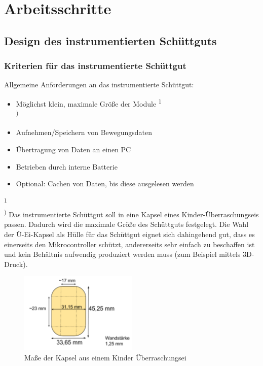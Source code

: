 \section{Arbeitsschritte}
 
\subsection{Design des instrumentierten Schüttguts}
\subsubsection{Kriterien für das instrumentierte Schüttgut}

Allgemeine Anforderungen an das instrumentierte Schüttgut:

\begin{itemize}
	\item Möglichst klein, maximale Größe der Module \textsuperscript{1\\)}
	\item Aufnehmen/Speichern von Bewegungsdaten
	\item Übertragung von Daten an einen PC
	\item Betrieben durch interne Batterie
	\item Optional: Cachen von Daten, bis diese ausgelesen werden 
\end{itemize}

\textsuperscript{1\\)} Das instrumentierte Schüttgut soll in eine Kapsel eines Kinder-Überraschungseis passen. Dadurch wird die maximale Größe des Schüttguts festgelegt. Die Wahl der Ü-Ei-Kapsel als Hülle für das Schüttgut eignet sich dahingehend gut, dass es einerseits den Mikrocontroller schützt, andererseits sehr einfach zu beschaffen ist und kein Behältnis aufwendig produziert werden muss (zum Beispiel mittels 3D-Druck).

\begin{figure}[ht]
	\centering
	\includegraphics[width=0.5\textwidth]{images/k3-ueei.PNG}
	\caption {Maße der Kapsel aus einem Kinder Überraschungsei}
	\label{fig:k3}
\end{figure}

